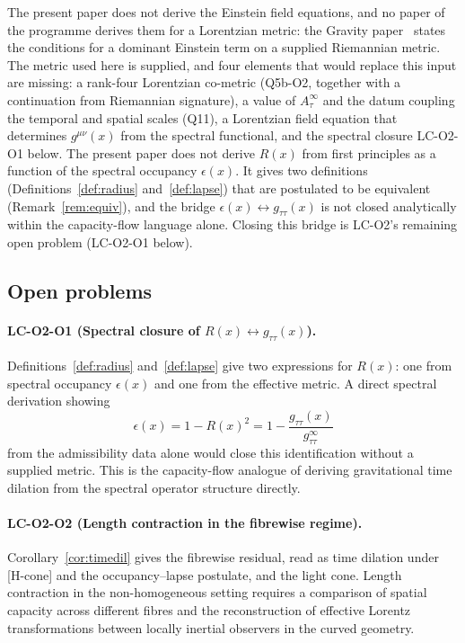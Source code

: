 \documentclass[11pt,a4paper]{article}
\begin{document}
    The present paper does not derive the Einstein field equations, and no paper of the programme derives them
    for a Lorentzian metric: the Gravity paper~\cite{Beau2026h} states the conditions for a dominant Einstein term
    on a supplied Riemannian metric.
    The metric used here is supplied, and four elements that would replace this input are missing:
    a rank-four Lorentzian co-metric (Q5b-O2, together with a continuation from Riemannian signature),
    a value of $A_\tau^\infty$ and the datum coupling the temporal and spatial scales (Q11),
    a Lorentzian field equation that determines $g^{\mu\nu}(x)$ from the spectral functional,
    and the spectral closure LC-O2-O1 below.
    The present paper does not derive $R(x)$ from first principles as a function of the
    spectral occupancy $\epsilon(x)$.
    It gives two definitions (Definitions~\ref{def:radius} and~\ref{def:lapse}) that are
    postulated to be equivalent (Remark~\ref{rem:equiv}), and the bridge $\epsilon(x) \leftrightarrow g_{\tau\tau}(x)$
    is not closed analytically within the capacity-flow language alone.
    Closing this bridge is LC-O2's remaining open problem (LC-O2-O1 below).

  \subsection{Open problems}

    \paragraph{LC-O2-O1 (Spectral closure of $R(x) \leftrightarrow g_{\tau\tau}(x)$).}
      Definitions~\ref{def:radius} and~\ref{def:lapse} give two expressions for $R(x)$:
      one from spectral occupancy $\epsilon(x)$ and one from the effective metric.
      A direct spectral derivation showing
      \[
        \epsilon(x) = 1-R(x)^2 = 1-\frac{g_{\tau\tau}(x)}{g_{\tau\tau}^\infty}
      \]
      from the admissibility data alone would close this identification without a supplied metric.
      This is the capacity-flow analogue of deriving gravitational time dilation from the
      spectral operator structure directly.

    \paragraph{LC-O2-O2 (Length contraction in the fibrewise regime).}
      Corollary~\ref{cor:timedil} gives the fibrewise residual, read as time dilation under [H-cone] and the
      occupancy--lapse postulate, and the light cone.
      Length contraction in the non-homogeneous setting requires a comparison of
      spatial capacity across different fibres and the reconstruction of effective Lorentz
      transformations between locally inertial observers in the curved geometry.
\end{document}
